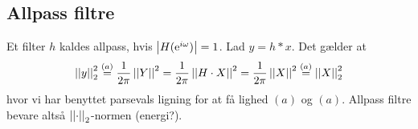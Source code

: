 \subsection*{Allpass filtre}
Et filter $h$ kaldes allpass, hvis $\left|H(\mathrm{e}^{i \omega})\right| = 1$.
Lad $y = h * x$. Det gælder at
\begin{equation*}
  \left|\left|y\right|\right|_{2}^{2} \stackrel{(a)}= \frac{1}{2\pi} \left|\left|Y\right|\right|^{2} = \frac{1}{2\pi} \left|\left|H \cdot X\right|\right|^{2} = \frac{1}{2\pi} \left|\left|X\right|\right|^{2} \stackrel{(a)}= \left|\left|X\right|\right|_{2}^{2}
\end{equation*}
hvor vi har benyttet parsevals ligning for at få lighed $(a)$ og $(a)$.
Allpass filtre bevare altså $\left|\left|\cdot\right|\right|_{2}$-normen (energi?).
